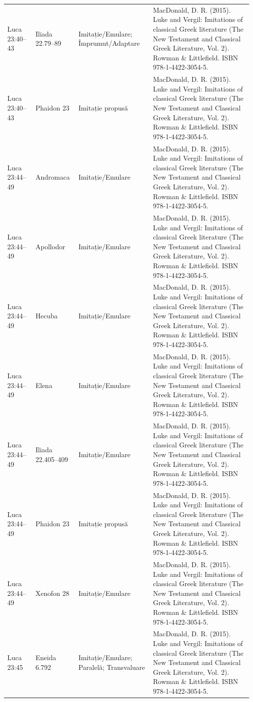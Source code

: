 \documentclass[12pt,a4paper,twoside,openany]{book}
\begin{document}
\begin{longtable}{L{1.4cm}L{1.7cm}L{3.1cm}L{8.4cm}}
Luca 23:40–43 & Iliada 22.79–89 & Imitație/Emulare; Împrumut/Adaptare & MacDonald, D. R. (2015). Luke and Vergil: Imitations of classical Greek literature (The New Testament and Classical Greek Literature, Vol. 2). Rowman \& Littlefield. ISBN 978-1-4422-3054-5. \\
Luca 23:40–43 & Phaidon 23 & Imitație propusă & MacDonald, D. R. (2015). Luke and Vergil: Imitations of classical Greek literature (The New Testament and Classical Greek Literature, Vol. 2). Rowman \& Littlefield. ISBN 978-1-4422-3054-5. \\
Luca 23:44–49 & Andromaca & Imitație/Emulare & MacDonald, D. R. (2015). Luke and Vergil: Imitations of classical Greek literature (The New Testament and Classical Greek Literature, Vol. 2). Rowman \& Littlefield. ISBN 978-1-4422-3054-5. \\
Luca 23:44–49 & Apollodor & Imitație/Emulare & MacDonald, D. R. (2015). Luke and Vergil: Imitations of classical Greek literature (The New Testament and Classical Greek Literature, Vol. 2). Rowman \& Littlefield. ISBN 978-1-4422-3054-5. \\
Luca 23:44–49 & Hecuba & Imitație/Emulare & MacDonald, D. R. (2015). Luke and Vergil: Imitations of classical Greek literature (The New Testament and Classical Greek Literature, Vol. 2). Rowman \& Littlefield. ISBN 978-1-4422-3054-5. \\
Luca 23:44–49 & Elena & Imitație/Emulare & MacDonald, D. R. (2015). Luke and Vergil: Imitations of classical Greek literature (The New Testament and Classical Greek Literature, Vol. 2). Rowman \& Littlefield. ISBN 978-1-4422-3054-5. \\
Luca 23:44–49 & Iliada 22.405–409 & Imitație/Emulare & MacDonald, D. R. (2015). Luke and Vergil: Imitations of classical Greek literature (The New Testament and Classical Greek Literature, Vol. 2). Rowman \& Littlefield. ISBN 978-1-4422-3054-5. \\
Luca 23:44–49 & Phaidon 23 & Imitație propusă & MacDonald, D. R. (2015). Luke and Vergil: Imitations of classical Greek literature (The New Testament and Classical Greek Literature, Vol. 2). Rowman \& Littlefield. ISBN 978-1-4422-3054-5. \\
Luca 23:44–49 & Xenofon 28 & Imitație/Emulare & MacDonald, D. R. (2015). Luke and Vergil: Imitations of classical Greek literature (The New Testament and Classical Greek Literature, Vol. 2). Rowman \& Littlefield. ISBN 978-1-4422-3054-5. \\
Luca 23:45 & Eneida 6.792 & Imitație/Emulare; Paralelă; Transvaluare & MacDonald, D. R. (2015). Luke and Vergil: Imitations of classical Greek literature (The New Testament and Classical Greek Literature, Vol. 2). Rowman \& Littlefield. ISBN 978-1-4422-3054-5. \\

\end{longtable}
\end{document}
